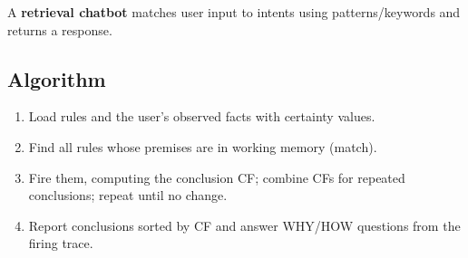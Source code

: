 \documentclass[11pt]{article}
\begin{document}
A \textbf{retrieval chatbot} matches user input to intents using patterns/keywords and returns a response.
\subsection*{Algorithm}
\begin{algo}[Procedure]\begin{enumerate}
\item Load rules and the user's observed facts with certainty values.
\item Find all rules whose premises are in working memory (match).
\item Fire them, computing the conclusion CF; combine CFs for repeated conclusions; repeat until no change.
\item Report conclusions sorted by CF and answer WHY/HOW questions from the firing trace.
\end{enumerate}\end{algo}
\end{document}
